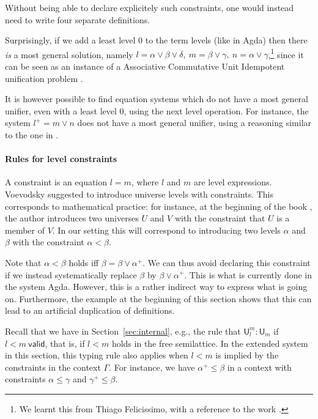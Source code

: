\documentclass[a4paper,UKenglish,cleveref, autoref, thm-restate]{lipics-v2021}
\newcommand{\UU}{\mathsf{U}}
\newcommand{\valid}{\mathsf{valid}}
\begin{document}
Without being able to declare explicitely such constraints,
one would instead need to write four separate definitions.

 Surprisingly, if we add a least level $0$ to the term levels (like in Agda) then there \emph{is} a most general solution,
 namely $l = \alpha\vee\beta\vee\delta,~m = \beta\vee\gamma,~n = \alpha\vee\gamma$,\footnote{We learnt this from
 Thiago Felicissimo, with a reference to the work \cite{FBB:impred2pred}.}
 since it can be seen as an instance of
 a Associative Commutative Unit Idempotent unification problem \cite{BaaderS94}.

 It is however possible to find equation systems which do not have a most general unifier, even with a least level $0$, using
 the next level operation. For instance, the system $l^+ = m\vee n$ does not have a most general unifier, using a reasoning
 similar to the one in \cite{FBB:impred2pred}.

\paragraph*{Rules for level constraints}

A constraint is an equation $l = m$, where $l$ and $m$ are level expressions.
Voevodsky \cite{VV} suggested to introduce universe levels with
constraints. This corresponds to mathematical practice:
for instance, at the beginning of the book \cite{giraud:cohom-non-abel},
the author introduces two universes $U$ and $V$ with the constraint
that $U$ is a member of $V$.
In our setting this will correspond to introducing two levels
$\alpha$ and $\beta$ with the constraint $\alpha<\beta$.

Note that $\alpha < \beta$ holds iff $\beta = \beta \vee\alpha^+$.
We can thus avoid declaring this constraint if we instead
systematically replace $\beta$ by $\beta\vee\alpha^+$.
This is what is currently done in the system Agda.
However, this is a rather indirect way to express what is
going on. Furthermore, the example at the beginning of this section
shows that this can lead to an artificial duplication of definitions.

Recall that we have in Section~\ref{sec:internal}, e.g., the rule
that $\UU^m_l:\UU_m$ if $l<m~\valid$, that is, if
$l<m$ holds in the free semilattice. %
In the extended system in this section, this typing rule also applies
when $l<m$ is implied by the constraints in the context $\Gamma$.
For instance, we have $\alpha^+\leqslant\beta$ in a context
with constraints $\alpha\leqslant\gamma$ and $\gamma^+\leqslant\beta$.
\end{document}
